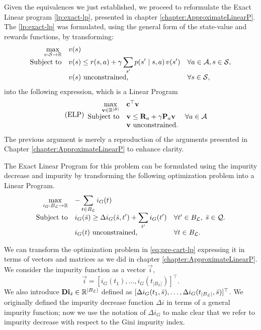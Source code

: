 Given the equivalences we just established, we proceed to reformulate the Exact
Linear program \eqref{lp:exact-lp}, presented in chapter
\ref{chapter:ApproximateLinearP}. The \eqref{lp:exact-lp} was formulated, using
the general form of the state-value and rewards functions, by transforming:
\begin{equation*}
\begin{array}{rl@{}ll}
    \displaystyle \max_{v: \States \to \R} & v(s) \\
    \text{Subject to} & \displaystyle v(s) \leq r(s,a) + \gamma \sum_{s'} p(s' \mid s, a) \, v(s') & \quad \forall a \in \Actions, s \in \States, \\
    & v(s) \text{ unconstrained,} & \quad \forall s \in \States,
\end{array}
\end{equation*}
into the following expression, which is a Linear Program
\begin{equation*}
\tag{ELP}
\begin{array}{rl@{}ll}
    \displaystyle \max_{\vec{v} \in \R^{|\States|}} & \vec{c}^{\top} \vec{v} \\
    \text{Subject to} & \vec{v} \leq \vec{R}_a + \gamma \vec{P}_a \vec{v} & \quad \forall a \in \Actions \\
    & \vec{v} \text{ unconstrained.} &
\end{array}
\end{equation*}
The previous argument is merely a reproduction of the arguments presented in
Chapter \ref{chapter:ApproximateLinearP} to enhance clarity.

The Exact Linear Program for this problem can be formulated using the impurity
decrease and impurity by transforming the following optimization problem into a
Linear Program.
\begin{equation}
\label{eq:pre-cart-lp}
\begin{array}{rl@{}ll}
    \displaystyle \max_{i_G: B_\L \to \R} & \displaystyle - \sum_{t \in B_\L} i_{G}(t) \\
    \text{Subject to} & \displaystyle i_{G}(\bar{s}) \geq \Delta i_{G}(\bar{s}, t') + \sum_{t'} i_{G}(t') & \quad \forall t' \in B_\L, \; \bar{s} \in \mathcal{Q}. \\
    & i_{G}(t) \text{ unconstrained,} & \quad \forall t \in B_\L.
\end{array}
\end{equation}

We can transform the optimization problem in \eqref{eq:pre-cart-lp} expressing
it in terms of vectors and matrices as we did in chapter
\ref{chapter:ApproximateLinearP}. We consider the impurity function as a vector
$\vec{i}$,
\[
    \vec{i} = \left[ i_{G}(t_1), \dots, i_{G}(t_{|B_L|}) \right]^{\top}.  
\]
We also introduce $\mathbf{Di}_{\bar{s}} \in \mathbb{R}^{|B_{\mathcal{L}}|}$ defined as $[\Delta
i_{G}(t_1, \bar{s}), \dots, \Delta i_{G}(t_{|B_{\mathcal{L}}|}, \bar{s})]^{\top}$. We
originally defined the impurity decrease function $\Delta i$ in terms of a
general impurity function; now we use the notation of $\Delta i_{G}$ to make
clear that we refer to impurity decrease with respect to the Gini impurity
index.


